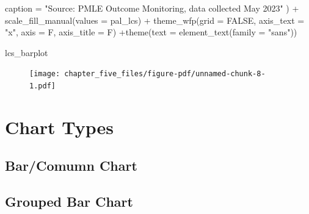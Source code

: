 \documentclass[
  letterpaper,
  DIV=11,
  numbers=noendperiod]{scrreprt}
\newenvironment{Shaded}{\begin{snugshade}}{\end{snugshade}}
\newcommand{\AttributeTok}[1]{\textcolor[rgb]{0.40,0.45,0.13}{#1}}
\newcommand{\ConstantTok}[1]{\textcolor[rgb]{0.56,0.35,0.01}{#1}}
\newcommand{\FunctionTok}[1]{\textcolor[rgb]{0.28,0.35,0.67}{#1}}
\newcommand{\NormalTok}[1]{\textcolor[rgb]{0.00,0.23,0.31}{#1}}
\newcommand{\SpecialCharTok}[1]{\textcolor[rgb]{0.37,0.37,0.37}{#1}}
\newcommand{\StringTok}[1]{\textcolor[rgb]{0.13,0.47,0.30}{#1}}
\begin{document}
\begin{Shaded}
\begin{Highlighting}[]
       \AttributeTok{caption =} \StringTok{"Source: PMLE Outcome Monitoring, data collected May 2023"}
\NormalTok{  ) }\SpecialCharTok{+}  \FunctionTok{scale\_fill\_manual}\NormalTok{(}\AttributeTok{values =}\NormalTok{ pal\_lcs) }\SpecialCharTok{+} \FunctionTok{theme\_wfp}\NormalTok{(}\AttributeTok{grid =} \ConstantTok{FALSE}\NormalTok{, }\AttributeTok{axis\_text =} \StringTok{"x"}\NormalTok{, }\AttributeTok{axis =}\NormalTok{ F, }\AttributeTok{axis\_title =}\NormalTok{ F) }\SpecialCharTok{+}\FunctionTok{theme}\NormalTok{(}\AttributeTok{text =} \FunctionTok{element\_text}\NormalTok{(}\AttributeTok{family =} \StringTok{"sans"}\NormalTok{)) }

\NormalTok{lcs\_barplot}
\end{Highlighting}
\end{Shaded}

\begin{figure}[H]

{\centering \texttt{[image: chapter\_five\_files/figure-pdf/unnamed-chunk-8-1.pdf]}

}

\end{figure}

\hypertarget{chart-types}{%
\section{Chart Types}\label{chart-types}}

\hypertarget{barcomumn-chart}{%
\subsection{Bar/Comumn Chart}\label{barcomumn-chart}}

\hypertarget{grouped-bar-chart}{%
\subsection{Grouped Bar Chart}\label{grouped-bar-chart}}
\end{document}
